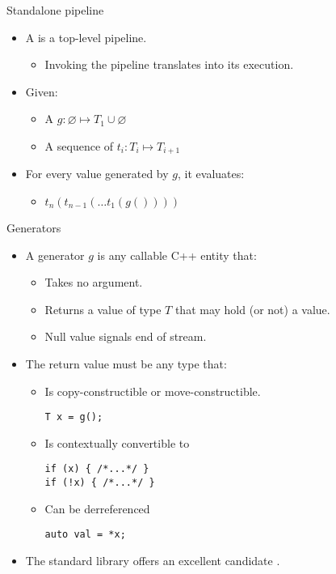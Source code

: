 \begin{frame}[t]{Standalone pipeline}
\begin{itemize}
  \item A   is a top-level pipeline.
    \begin{itemize}
      \item Invoking the pipeline translates into its execution.
    \end{itemize}

  \vfill\pause
  \item Given:
    \begin{itemize}
      \item A  $g : \varnothing \mapsto T_1 \cup \varnothing$
      \item A sequence of  $t_i : T_i \mapsto T_{i+1}$
    \end{itemize}

  \vfill
  \item For every  value generated by $g$, it evaluates:
    \begin{itemize}
      \item $t_n(t_{n-1}(\ldots t_1(g())))$
    \end{itemize}
\end{itemize}
\end{frame}

\begin{frame}[t,fragile]{Generators}
\vspace{-1em}
\begin{itemize}
  \item A generator $g$ is any callable C++ entity that:
    \begin{itemize}
      \item Takes no argument.
      \item Returns a value of type $T$ that may hold (or not) a value.
      \item Null value signals end of stream.
    \end{itemize}

  \vfill\pause
  \item The return value must be any type that:
    \begin{itemize}
      \item Is copy-constructible or move-constructible.
\begin{lstlisting}
T x = g();
\end{lstlisting}
      \pause
      \item Is contextually convertible to 
\begin{lstlisting}
if (x) { /*...*/ }
if (!x) { /*...*/ }
\end{lstlisting}
      \pause
      \item Can be derreferenced
\begin{lstlisting}
auto val = *x;
\end{lstlisting}
    \end{itemize}
  \vfill\pause
  \item The standard library offers an excellent candidate .
\end{itemize}
\end{frame}

